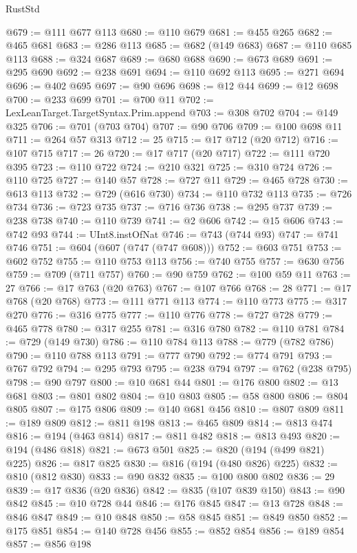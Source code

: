 \begin{lexlean}{RustStd}
\begin{coremodule}
{\begin{coremodule}
{{{{{{{{{{{{{{{{{{{{{{{{{{{{{{{{{{{{{{{{{{{{{@679 := @111 @677 @113
@680 := @110 @679
@681 := @455 @265
@682 := @465 @681
@683 := @286 @113
@685 := @682 (@149 @683)
@687 := @110 @685 @113
@688 := @324 @687
@689 := @680 @688
@690 := @673 @689
@691 := @295 @690
@692 := @238 @691
@694 := @110 @692 @113
@695 := @271 @694
@696 := @402 @695
@697 := @90 @696
@698 := @12 @44
@699 := @12 @698
@700 := @233 @699
@701 := @700 @11
@702 := LexLeanTarget.TargetSyntax.Prim.append
@703 := @308 @702
@704 := @149 @325
@706 := @701 (@703 @704)
@707 := @90 @706
@709 := @100 @698 @11
@711 := @264 @57 @313
@712 := 25
@715 := @17 @712 (@20 @712)
@716 := @107 @715
@717 := 26
@720 := @17 @717 (@20 @717)
@722 := @111 @720 @395
@723 := @110 @722
@724 := @210 @321
@725 := @310 @724
@726 := @110 @725
@727 := @140 @57
@728 := @727 @11
@729 := @465 @728
@730 := @613 @113
@732 := @729 (@616 @730)
@734 := @110 @732 @113
@735 := @726 @734
@736 := @723 @735
@737 := @716 @736
@738 := @295 @737
@739 := @238 @738
@740 := @110 @739
@741 := @2 @606
@742 := @15 @606
@743 := @742 @93
@744 := UInt8.instOfNat
@746 := @743 (@744 @93)
@747 := @741 @746
@751 := @604 (@607 (@747 (@747 @608)))
@752 := @603 @751
@753 := @602 @752
@755 := @110 @753 @113
@756 := @740 @755
@757 := @630 @756
@759 := @709 (@711 @757)
@760 := @90 @759
@762 := @100 @59 @11
@763 := 27
@766 := @17 @763 (@20 @763)
@767 := @107 @766
@768 := 28
@771 := @17 @768 (@20 @768)
@773 := @111 @771 @113
@774 := @110 @773
@775 := @317 @270
@776 := @316 @775
@777 := @110 @776
@778 := @727 @728
@779 := @465 @778
@780 := @317 @255
@781 := @316 @780
@782 := @110 @781
@784 := @729 (@149 @730)
@786 := @110 @784 @113
@788 := @779 (@782 @786)
@790 := @110 @788 @113
@791 := @777 @790
@792 := @774 @791
@793 := @767 @792
@794 := @295 @793
@795 := @238 @794
@797 := @762 (@238 @795)
@798 := @90 @797
@800 := @10 @681 @44
@801 := @176 @800
@802 := @13 @681
@803 := @801 @802
@804 := @10 @803
@805 := @58 @800
@806 := @804 @805
@807 := @175 @806
@809 := @140 @681 @456
@810 := @807 @809
@811 := @189 @809
@812 := @811 @198
@813 := @465 @809
@814 := @813 @474
@816 := @194 (@463 @814)
@817 := @811 @482
@818 := @813 @493
@820 := @194 (@486 @818)
@821 := @673 @501
@825 := @820 (@194 (@499 @821) @225)
@826 := @817 @825
@830 := @816 (@194 (@480 @826) @225)
@832 := @810 (@812 @830)
@833 := @90 @832
@835 := @100 @800 @802
@836 := 29
@839 := @17 @836 (@20 @836)
@842 := @835 (@107 @839 @150)
@843 := @90 @842
@845 := @10 @728 @44
@846 := @176 @845
@847 := @13 @728
@848 := @846 @847
@849 := @10 @848
@850 := @58 @845
@851 := @849 @850
@852 := @175 @851
@854 := @140 @728 @456
@855 := @852 @854
@856 := @189 @854
@857 := @856 @198
}}}}}}}}}}}}}}}}}}}}}}}}}}}}}}}}}}}}}}}}}}}}}
\end{coremodule}}
\end{coremodule}
\end{lexlean}
